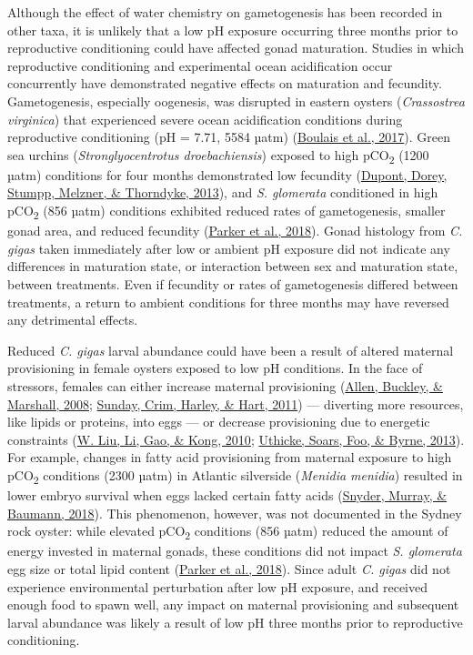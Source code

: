 \documentclass [11pt, proquest] {uwthesis}[2015/03/03]
\begin{document}
Although the effect of water chemistry on gametogenesis has been recorded in other taxa, it is unlikely that a low pH exposure occurring three months prior to reproductive conditioning could have affected gonad maturation. Studies in which reproductive conditioning and experimental ocean acidification occur concurrently have demonstrated negative effects on maturation and fecundity. Gametogenesis, especially oogenesis, was disrupted in eastern oysters (\emph{Crassostrea virginica}) that experienced severe ocean acidification conditions during reproductive conditioning (pH = 7.71, 5584 µatm) (\protect\hyperlink{ref-Boulais2017}{Boulais et al., 2017}). Green sea urchins (\emph{Stronglyocentrotus droebachiensis}) exposed to high pCO\textsubscript{2} (1200 µatm) conditions for four months demonstrated low fecundity (\protect\hyperlink{ref-Dupont2013}{Dupont, Dorey, Stumpp, Melzner, \& Thorndyke, 2013}), and \emph{S. glomerata} conditioned in high pCO\textsubscript{2} (856 µatm) conditions exhibited reduced rates of gametogenesis, smaller gonad area, and reduced fecundity (\protect\hyperlink{ref-Parker2018}{Parker et al., 2018}). Gonad histology from \emph{C. gigas} taken immediately after low or ambient pH exposure did not indicate any differences in maturation state, or interaction between sex and maturation state, between treatments. Even if fecundity or rates of gametogenesis differed between treatments, a return to ambient conditions for three months may have reversed any detrimental effects.

Reduced \emph{C. gigas} larval abundance could have been a result of altered maternal provisioning in female oysters exposed to low pH conditions. In the face of stressors, females can either increase maternal provisioning (\protect\hyperlink{ref-Allen2008}{Allen, Buckley, \& Marshall, 2008}; \protect\hyperlink{ref-Sunday2011}{Sunday, Crim, Harley, \& Hart, 2011}) --- diverting more resources, like lipids or proteins, into eggs --- or decrease provisioning due to energetic constraints (\protect\hyperlink{ref-Liu2010}{W. Liu, Li, Gao, \& Kong, 2010}; \protect\hyperlink{ref-Uthicke2013}{Uthicke, Soars, Foo, \& Byrne, 2013}). For example, changes in fatty acid provisioning from maternal exposure to high pCO\textsubscript{2} conditions (2300 µatm) in Atlantic silverside (\emph{Menidia menidia}) resulted in lower embryo survival when eggs lacked certain fatty acids (\protect\hyperlink{ref-Snyder2018}{Snyder, Murray, \& Baumann, 2018}). This phenomenon, however, was not documented in the Sydney rock oyster: while elevated pCO\textsubscript{2} conditions (856 µatm) reduced the amount of energy invested in maternal gonads, these conditions did not impact \emph{S. glomerata} egg size or total lipid content (\protect\hyperlink{ref-Parker2018}{Parker et al., 2018}). Since adult \emph{C. gigas} did not experience environmental perturbation after low pH exposure, and received enough food to spawn well, any impact on maternal provisioning and subsequent larval abundance was likely a result of low pH three months prior to reproductive conditioning.
\end{document}
